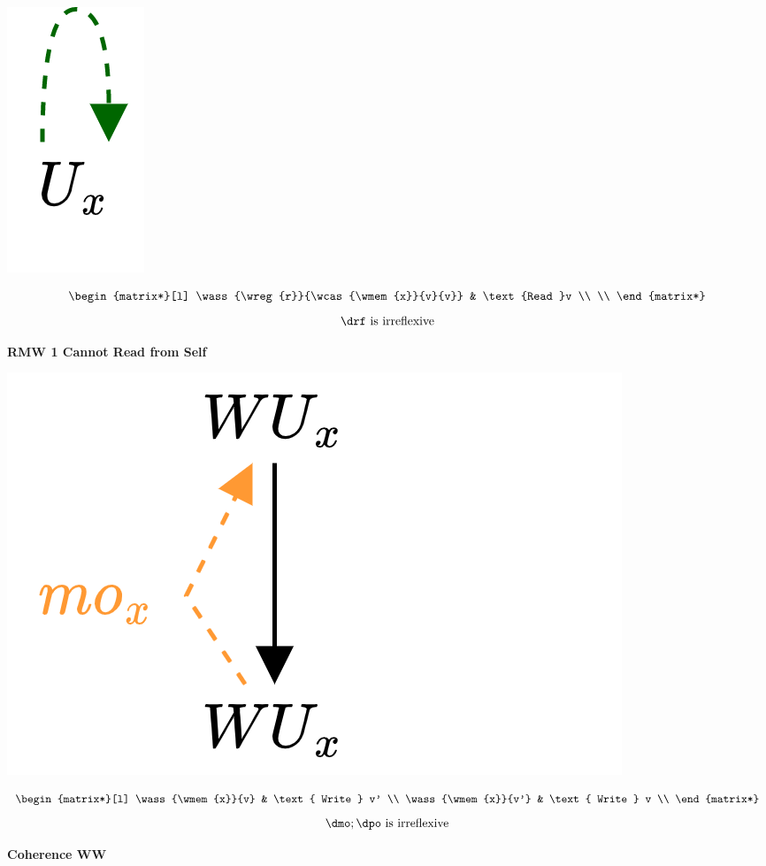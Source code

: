 \begin{minipage}[b]{.33\textwidth}
	\begin{center}
		\includegraphics[scale=.15]{declarative_semantics/images/bad_patterns_rmw_1.drawio.png}
	\end{center}
	\[
		\begin{matrix*}[l]
			\wass{\wreg{r}}{\wcas{\wmem{x}}{v}{v}} & \text{Read }v \\
			\\
		\end{matrix*}
	\]
	\[\drf \text{ is irreflexive}\]
	\centerline{\textbf{RMW 1 Cannot Read from Self}}
\end{minipage}
\begin{minipage}[b]{.33\textwidth}
	\begin{center}
		\includegraphics[scale=.15]{declarative_semantics/images/bad_patterns_coherence_ww.drawio.png}
	\end{center}
	\[\begin{matrix*}[l]
			\wass{\wmem{x}}{v} & \text{ Write } v' \\
			\wass{\wmem{x}}{v'} & \text{ Write } v \\
		\end{matrix*}\]
	\[\dmo ; \dpo \text{ is irreflexive}\]
	\centerline{\textbf{Coherence WW}}
\end{minipage}
